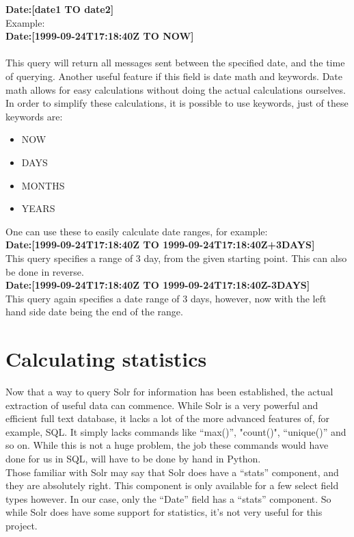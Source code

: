 \documentclass[a4paper,english]{report}
\begin{document}
\textbf{Date:[date1 TO date2]}\\

Example:\\


\textbf{Date:[1999-09-24T17:18:40Z TO NOW]}\\\\

This query will return all messages sent between the specified date, and the time of querying.
Another useful feature if this field is date math and keywords. Date math allows for easy calculations without doing the actual calculations ourselves. In order to simplify these calculations, it is possible to use keywords, just of these keywords are:

\begin{itemize}

\item NOW 
\item DAYS
\item MONTHS 
\item YEARS 

\end{itemize}

One can use these to easily calculate date ranges, for example: \\
	


\textbf{Date:[1999-09-24T17:18:40Z TO 1999-09-24T17:18:40Z+3DAYS]}\\ 


This query specifies a range of 3 day, from the given starting point. This can also be done in reverse.\\

\textbf{Date:[1999-09-24T17:18:40Z TO 1999-09-24T17:18:40Z-3DAYS]}\\

This query again specifies a date range of 3 days, however, now with the left hand side date being the end of the range.

\chapter{Calculating statistics}
Now that a way to query Solr for information has been established, the actual extraction of useful data can commence. While Solr is a very powerful and efficient full text database, it lacks a lot of the more advanced features of, for example, SQL. It simply lacks commands like “max()”, "count()", “unique()” and so on. While this is not a huge problem, the job these commands would have done for us in SQL, will have to be done by hand in Python.\\ 
Those familiar with Solr may say that Solr does have a “stats” component, and they are absolutely right. This component is only available for a few select field types however. In our case, only the “Date” field has a “stats” component. So while Solr does have some support for statistics, it's not very useful for this project.
\end{document}
